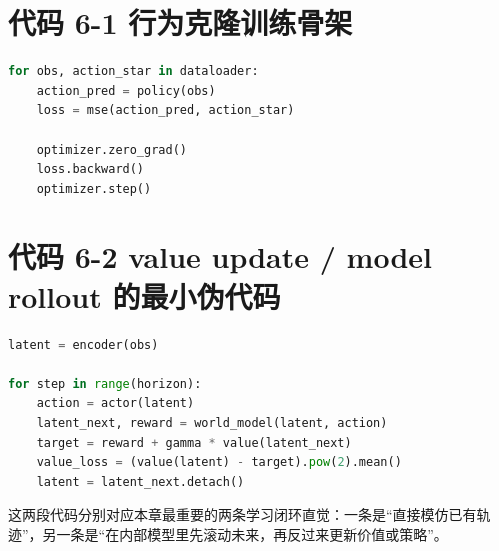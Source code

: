 \chapter*{代码 6-1 行为克隆训练骨架}

\begin{lstlisting}[language=python]
for obs, action_star in dataloader:
    action_pred = policy(obs)
    loss = mse(action_pred, action_star)

    optimizer.zero_grad()
    loss.backward()
    optimizer.step()
\end{lstlisting}

\chapter*{代码 6-2 value update / model rollout 的最小伪代码}

\begin{lstlisting}[language=python]
latent = encoder(obs)

for step in range(horizon):
    action = actor(latent)
    latent_next, reward = world_model(latent, action)
    target = reward + gamma * value(latent_next)
    value_loss = (value(latent) - target).pow(2).mean()
    latent = latent_next.detach()
\end{lstlisting}

这两段代码分别对应本章最重要的两条学习闭环直觉：一条是“直接模仿已有轨迹”，另一条是“在内部模型里先滚动未来，再反过来更新价值或策略”。
